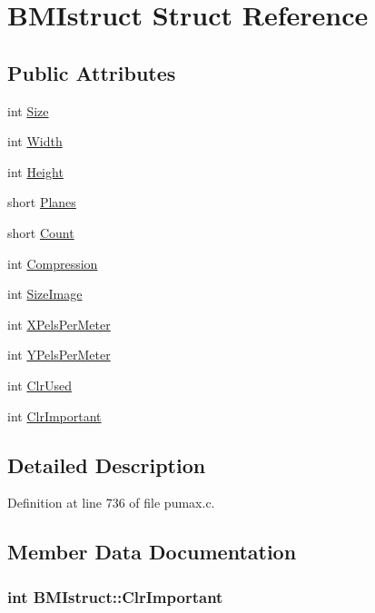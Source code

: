 \hypertarget{struct_b_m_istruct}{
\section{\-B\-M\-Istruct \-Struct \-Reference}
\label{struct_b_m_istruct}
}
\subsection*{\-Public \-Attributes}
\begin{DoxyCompactItemize}
\item 
int \hyperlink{struct_b_m_istruct_acfe239d5fa92bc82701fafaf72efcacf}{\-Size}
\item 
int \hyperlink{struct_b_m_istruct_a6486fcb19864264947f29b30c5a1d6e9}{\-Width}
\item 
int \hyperlink{struct_b_m_istruct_a52746e7d2f7de61866c6a2217083d1a5}{\-Height}
\item 
short \hyperlink{struct_b_m_istruct_a29b39d5bd71bb03b8b09b0de1a4b9c8d}{\-Planes}
\item 
short \hyperlink{struct_b_m_istruct_a116a68a16b53430a1a9f0bdf657e53c8}{\-Count}
\item 
int \hyperlink{struct_b_m_istruct_a28c320842950835ff4de540ed4c4b4fd}{\-Compression}
\item 
int \hyperlink{struct_b_m_istruct_a11df57e6d765d04cd654eb68e9ed5606}{\-Size\-Image}
\item 
int \hyperlink{struct_b_m_istruct_ad14c3cac819fdb1563374c2ef4913aac}{\-X\-Pels\-Per\-Meter}
\item 
int \hyperlink{struct_b_m_istruct_a0eae4b963d52b8a8eb15fc6275f8b481}{\-Y\-Pels\-Per\-Meter}
\item 
int \hyperlink{struct_b_m_istruct_a8f8f9ef7e30ba0653ba479b28676c3ce}{\-Clr\-Used}
\item 
int \hyperlink{struct_b_m_istruct_a357dc62501d321ff870187909c3c4b5f}{\-Clr\-Important}
\end{DoxyCompactItemize}


\subsection{\-Detailed \-Description}


\-Definition at line 736 of file pumax.\-c.



\subsection{\-Member \-Data \-Documentation}
\hypertarget{struct_b_m_istruct_a357dc62501d321ff870187909c3c4b5f}{
\subsubsection[{\-Clr\-Important}]{\setlength{\rightskip}{0pt plus 5cm}int {\bf \-B\-M\-Istruct\-::\-Clr\-Important}}}
\label{struct_b_m_istruct_a357dc62501d321ff870187909c3c4b5f}



